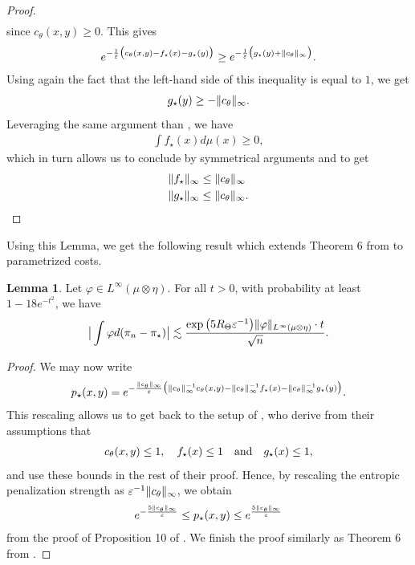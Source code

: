 \documentclass{article}
\DeclarePairedDelimiter\norm{\lVert}{\rVert}%
\theoremstyle{definition}
\newtheorem{lemma}[theorem]{Lemma}
\begin{document}
\begin{proof}
\begin{align*}
    \end{align*}
    since $c_\theta(x,y) \geq 0$. This gives 
    \begin{align*}
        e^{-\frac{1}{\varepsilon}\big(c_\theta(x,y)-f_\star(x)-g_\star(y)\big)} \geq e^{-\frac{1}{\varepsilon}\big(g_\star(y)+ \norm{c_\theta}_\infty\big)}.
    \end{align*}
    Using again the fact that the left-hand side of this inequality is equal to $1$, we get 
    \begin{align*}
        g_\star(y) \geq -\norm{c_\theta}_\infty. 
    \end{align*}
    Leveraging the same argument than \citet{rigollet2022sample}, we have 
    \begin{align*}
        \int f_\star(x)d\mu(x) \geq 0,
    \end{align*}
    which in turn allows us to conclude by symmetrical arguments and to get
    \begin{align*}
        & \norm{f_\star}_\infty \leq \norm{c_\theta}_\infty\\
        & \norm{g_\star}_\infty \leq \norm{c_\theta}_\infty.
    \end{align*}
\end{proof}
Using this Lemma, we get the following result which extends Theorem 6 from \citet{rigollet2022sample} to parametrized costs. 
\begin{lemma}
\label{lemma:extended_rigollet}
Let $\varphi \in L^\infty(\mu \otimes \eta)$. For all $t > 0$, with probability at least $1-18e^{-t^2}$, we have
\begin{align*}
    \big\lvert \int \varphi d(\pi_n-\pi_\star) \big\lvert \lesssim \frac{\exp\big(5R_\Theta \varepsilon^{-1}\big) \norm{\varphi}_{L^\infty(\mu \otimes \eta)}\cdot t}{\sqrt{n}}.
\end{align*}
\end{lemma}
\begin{proof}
    We may now write 
    \begin{align*}
        p_\star(x,y) = e^{-\frac{\norm{c_\theta}_\infty}{\varepsilon}\big(\norm{c_\theta}_\infty^{-1}c_\theta(x,y)-\norm{c_\theta}_\infty^{-1}f_\star(x)-\norm{c_\theta}_\infty^{-1}g_\star(y)\big)}.
    \end{align*}
    This rescaling allows us to get back to the setup of \citet{rigollet2022sample}, who derive from their assumptions that 
    \begin{align*}
        c_\theta(x,y) \leq 1, \quad f_\star(x) \leq 1 \quad \textnormal{and} \quad g_\star(x) \leq 1,
    \end{align*}
    and use these bounds in the rest of their proof. Hence, by rescaling the entropic penalization strength as $ \varepsilon^{-1}\norm{c_\theta}_\infty$, we obtain 
    \begin{align*}
         e^{-\frac{5\norm{c_\theta}_\infty}{\varepsilon}} \leq p_\star(x,y) \leq e^{\frac{5\norm{c_\theta}_\infty}{\varepsilon}}
    \end{align*}
    from the proof of Proposition 10 of \citet{rigollet2022sample}.
    We finish the proof similarly as Theorem 6 from \citet{rigollet2022sample}.
\end{proof}
\end{document}
